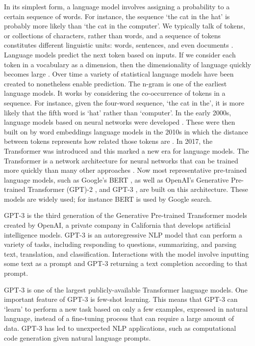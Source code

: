 \documentclass{bmcart}
\begin{document}
In its simplest form, a language model involves assigning a probability to a certain sequence of words. For instance, the sequence `the cat in the hat' is probably more likely than `the cat in the computer'. We typically talk of tokens, or collections of characters, rather than words, and a sequence of tokens constitutes different linguistic units: words, sentences, and even documents \cite{bengio2003neural}. Language models predict the next token based on inputs. If we consider each token in a vocabulary as a dimension, then the dimensionality of language quickly becomes large \cite{rosenfeld2000two}. Over time a variety of statistical language models have been created to nonetheless enable prediction. The n-gram is one of the earliest language models. It works by considering the co-occurrence of tokens in a sequence. For instance, given the four-word sequence, `the cat in the', it is more likely that the fifth word is `hat' rather than `computer'. In the early 2000s, language models based on neural networks were developed \cite{bengio2003neural}. These were then built on by word embeddings language models in the 2010s in which the distance between tokens represents how related those tokens are \cite{turian2010word}. In 2017, the Transformer was introduced \cite{vaswani2017attention} and this marked a new era for language models. The Transformer is a network architecture for neural networks that can be trained more quickly than many other approaches \cite{vaswani2017attention}. Now most representative pre-trained language models, such as Google's BERT \cite{devlin2018bert}, as well as OpenAI's Generative Pre-trained Transformer (GPT)-2 \cite{radford2019language}, and GPT-3 \cite{brown2020language}, are built on this architecture. These models are widely used; for instance BERT is used by Google search.

GPT-3 is the third generation of the Generative Pre-trained Transformer models created by OpenAI, a private company in California that develops artificial intelligence models. GPT-3 is an autoregressive NLP model that can perform a variety of tasks, including responding to questions, summarizing, and parsing text, translation, and classification. Interactions with the model involve inputting some text as a prompt and GPT-3 returning a text completion according to that prompt.

GPT-3 is one of the largest publicly-available Transformer language models. One important feature of GPT-3 is few-shot learning. This means that GPT-3 can `learn' to perform a new task based on only a few examples, expressed in natural language, instead of a fine-tuning process that can require a large amount of data. GPT-3 has led to unexpected NLP applications, such as computational code generation given natural language prompts.
\end{document}
